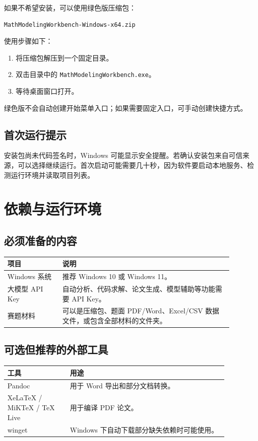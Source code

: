 \documentclass[UTF8,a4paper,12pt]{ctexart}
\begin{document}
如果不希望安装，可以使用绿色版压缩包：

\begin{verbatim}
MathModelingWorkbench-Windows-x64.zip
\end{verbatim}

使用步骤如下：

\begin{enumerate}
  \item 将压缩包解压到一个固定目录。
  \item 双击目录中的 \texttt{MathModelingWorkbench.exe}。
  \item 等待桌面窗口打开。
\end{enumerate}

绿色版不会自动创建开始菜单入口；如果需要固定入口，可手动创建快捷方式。

\subsection{首次运行提示}

安装包尚未代码签名时，Windows 可能显示安全提醒。若确认安装包来自可信来源，可以选择继续运行。首次启动可能需要几十秒，因为软件要启动本地服务、检测运行环境并读取项目列表。

\section{依赖与运行环境}

\subsection{必须准备的内容}

\begin{longtable}{p{0.22\linewidth}p{0.68\linewidth}}
\toprule
项目 & 说明 \\
\midrule
Windows 系统 & 推荐 Windows 10 或 Windows 11。 \\
大模型 API Key & 自动分析、代码求解、论文生成、模型辅助等功能需要 API Key。 \\
赛题材料 & 可以是压缩包、题面 PDF/Word、Excel/CSV 数据文件，或包含全部材料的文件夹。 \\
\bottomrule
\end{longtable}

\subsection{可选但推荐的外部工具}

\begin{longtable}{p{0.25\linewidth}p{0.63\linewidth}}
\toprule
工具 & 用途 \\
\midrule
Pandoc & 用于 Word 导出和部分文档转换。 \\
XeLaTeX / MiKTeX / TeX Live & 用于编译 PDF 论文。 \\
winget & Windows 下自动下载部分缺失依赖时可能使用。 \\
\bottomrule
\end{longtable}
\end{document}
